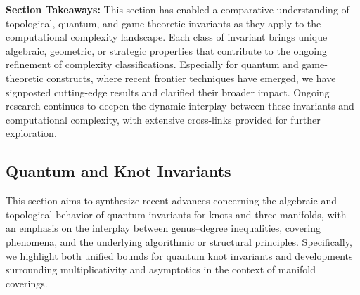 \documentclass[sigconf]{acmart}
\begin{document}

\textbf{Section Takeaways:} This section has enabled a comparative understanding of topological, quantum, and game-theoretic invariants as they apply to the computational complexity landscape. Each class of invariant brings unique algebraic, geometric, or strategic properties that contribute to the ongoing refinement of complexity classifications. Especially for quantum and game-theoretic constructs, where recent frontier techniques have emerged, we have signposted cutting-edge results and clarified their broader impact. Ongoing research continues to deepen the dynamic interplay between these invariants and computational complexity, with extensive cross-links provided for further exploration.

\subsection{Quantum and Knot Invariants}

This section aims to synthesize recent advances concerning the algebraic and topological behavior of quantum invariants for knots and three-manifolds, with an emphasis on the interplay between genus–degree inequalities, covering phenomena, and the underlying algorithmic or structural principles. Specifically, we highlight both unified bounds for quantum knot invariants and developments surrounding multiplicativity and asymptotics in the context of manifold coverings.
\end{document}
